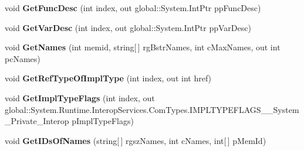 \begin{DoxyCompactItemize}
void {\bfseries Get\+Func\+Desc} (int index, out global\+::\+System.\+Int\+Ptr pp\+Func\+Desc)
\item 
\mbox{\label{interface_system_1_1_runtime_1_1_interop_services_1_1_com_types_1_1_i_type_info_____system___private___interop_a6864af0a73b4667a1b3ff9f71a65f317}} 
void {\bfseries Get\+Var\+Desc} (int index, out global\+::\+System.\+Int\+Ptr pp\+Var\+Desc)
\item 
\mbox{\label{interface_system_1_1_runtime_1_1_interop_services_1_1_com_types_1_1_i_type_info_____system___private___interop_a161d5d3ddd1aa44629b27be7d6caaee7}} 
void {\bfseries Get\+Names} (int memid, string\mbox{[}$\,$\mbox{]} rg\+Bstr\+Names, int c\+Max\+Names, out int pc\+Names)
\item 
\mbox{\label{interface_system_1_1_runtime_1_1_interop_services_1_1_com_types_1_1_i_type_info_____system___private___interop_a6589519f0c86fa462b9a03ab2a78b59d}} 
void {\bfseries Get\+Ref\+Type\+Of\+Impl\+Type} (int index, out int href)
\item 
\mbox{\label{interface_system_1_1_runtime_1_1_interop_services_1_1_com_types_1_1_i_type_info_____system___private___interop_ae5c606ba7b1dd1ba41edfa764de5bf7f}} 
void {\bfseries Get\+Impl\+Type\+Flags} (int index, out global\+::\+System.\+Runtime.\+Interop\+Services.\+Com\+Types.\+I\+M\+P\+L\+T\+Y\+P\+E\+F\+L\+A\+G\+S\+\_\+\+\_\+\+System\+\_\+\+Private\+\_\+\+Interop p\+Impl\+Type\+Flags)
\item 
\mbox{\label{interface_system_1_1_runtime_1_1_interop_services_1_1_com_types_1_1_i_type_info_____system___private___interop_a6aa20dbdd253a9bb2b4072bf7d6ea031}} 
void {\bfseries Get\+I\+Ds\+Of\+Names} (string\mbox{[}$\,$\mbox{]} rgsz\+Names, int c\+Names, int\mbox{[}$\,$\mbox{]} p\+Mem\+Id)
\item 

\end{DoxyCompactItemize}
